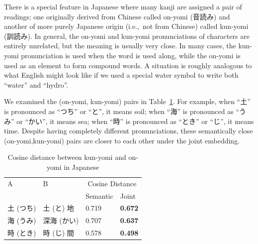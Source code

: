 \begin{CJK}{UTF8}{ipxm}
    There is a special feature in Japanese where many kanji are assigned a pair of readings; one originally derived from Chinese called on-yomi (音読み) and another of more purely Japanese origin (i.e.,\ not from Chinese) called kun-yomi (訓読み).  In general, the on-yomi and kun-yomi pronunciations of characters are entirely unrelated, but the meaning is usually very close. In many cases, the kun-yomi pronunciation is used when the word is used along, while the on-yomi is used as an element to form compound words.  A situation is roughly analogous to what English might look like if we used a special water symbol to write both ``water'' and ``hydro''.  

    We examined the (on-yomi, kun-yomi) pairs in Table~\ref{tab:analysis_heteronym3}. For example, when ``土'' is pronounced as ``つち'' or ``と'', it means soil; when ``海'' is pronounced as ``うみ'' or ``かい'', it means sea; when ``時'' is pronounced as ``とき'' or ``じ'', it means time.  Despite having completely different pronunciations, these semantically close (on-yomi,kun-yomi) pairs are closer to each other under the joint embedding.
\end{CJK}

\vspace{0.1cm}    
\begin{table}[h]
    \centering
    \begin{CJK}{UTF8}{ipxm}
        \begin{tabularx}{\textwidth}{bbbb}
            \toprule
            \multirow{2.5}{*}{A} & \multirow{2.5}{*}{B} & \multicolumn{2}{c}{Cosine Distance} \\
            \cmidrule(lr){3-4} {} & {} & Semantic & Joint \\\midrule
            土 (つち) & 土 (と) 地 & 0.719 & \textbf{0.672} \\
            海 (うみ) & 深海 (かい) & 0.707 & \textbf{0.637} \\
            時 (とき) & 時 (じ) 間 & 0.578 & \textbf{0.498} \\\bottomrule
        \end{tabularx}
    \end{CJK}
    \caption{Cosine distance between kun-yomi and on-yomi in Japanese}
    \label{tab:analysis_heteronym3}
\end{table}
